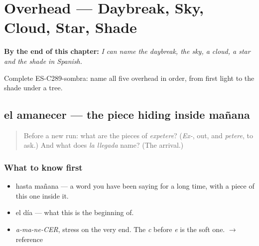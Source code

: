 
\chapter{Overhead --- Daybreak, Sky, Cloud, Star, Shade}
\label{ch:lo-de-arriba}

\begin{chapteropening}
\textbf{By the end of this chapter:} \emph{I can name the daybreak, the sky, a cloud, a star and the shade in Spanish.}

Complete ES-C289-sombra: name all five overhead in order, from first light to the shade under a tree.
\end{chapteropening}

\section[el amanecer]{el amanecer — the piece hiding inside mañana}

\label{lesson:ES-C289-amanecer}



\begin{quote}
Before a new run: what are the pieces of \emph{expetere}? (\emph{Ex-}, out, and \emph{petere}, to ask.) And what does \emph{la llegada} name? (The arrival.)
\end{quote}

\subsection*{What to know first}
\begin{itemize}
\raggedright
  \item hasta mañana — a word you have been saying for a long time, with a piece of this one inside it.
  \item el día — what this is the beginning of.
\end{itemize}

\begin{sounds}
\begin{itemize}
\raggedright
  \item \emph{a-ma-ne-CER}, stress on the very end. The \emph{c} before \emph{e} is the soft one. $\to$ reference
\end{itemize}
\end{sounds}

